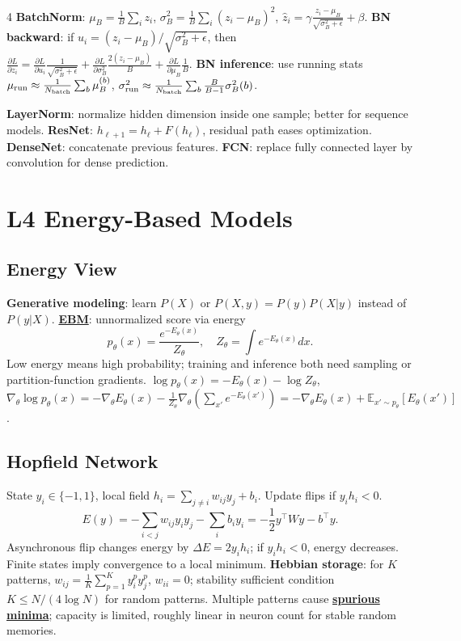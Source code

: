 \documentclass{article}
\newcommand{\key}[1]{\textbf{#1}}
\newcommand{\lowterm}[1]{\textbf{\underline{#1}}}
\newcommand{\E}{\mathbb{E}}
\newcommand{\1}{\mathbf 1}
\begin{document}
\begin{multicols*}{4}
\key{BatchNorm}: $\mu_B=\frac1B\sum_i z_i$, $\sigma_B^2=\frac1B\sum_i(z_i-\mu_B)^2$,
\(
\hat z_i=\gamma\frac{z_i-\mu_B}{\sqrt{\sigma_B^2+\epsilon}}+\beta.
\)
\key{BN backward}: if $u_i=(z_i-\mu_B)/\sqrt{\sigma_B^2+\epsilon}$, then
$\frac{\partial L}{\partial z_i}=\frac{\partial L}{\partial u_i}\frac1{\sqrt{\sigma_B^2+\epsilon}}+\frac{\partial L}{\partial\sigma_B^2}\frac{2(z_i-\mu_B)}{B}+\frac{\partial L}{\partial\mu_B}\frac1B$.
\key{BN inference}: use running stats
$\mu_{\rm run}\approx\frac1{N_{\rm batch}}\sum_b\mu_B^{(b)}$, $\sigma_{\rm run}^2\approx\frac1{N_{\rm batch}}\sum_b\frac{B}{B-1}\sigma_B^2(b)$.

\key{LayerNorm}: normalize hidden dimension inside one sample; better for sequence models. \key{ResNet}: $h_{\ell+1}=h_\ell+F(h_\ell)$, residual path eases optimization. \key{DenseNet}: concatenate previous features. \key{FCN}: replace fully connected layer by convolution for dense prediction.

\section{L4 Energy-Based Models}
\subsection{Energy View}
\key{Generative modeling}: learn $P(X)$ or $P(X,y)=P(y)P(X|y)$ instead of $P(y|X)$. \lowterm{EBM}: unnormalized score via energy
\[
p_\theta(x)=\frac{e^{-E_\theta(x)}}{Z_\theta},\quad Z_\theta=\int e^{-E_\theta(x)}dx.
\]
Low energy means high probability; training and inference both need sampling or partition-function gradients. $\log p_\theta(x)=-E_\theta(x)-\log Z_\theta$, $\nabla_\theta\log p_\theta(x)=-\nabla_\theta E_\theta(x)-\frac{1}{Z_\theta}\nabla_\theta \left(\sum_{x'} e^{-E_\theta(x')}\right)=-\nabla_\theta E_\theta(x)+\E_{x'\sim p_\theta}[E_\theta(x')]$. 

\subsection{Hopfield Network}
State $y_i\in\{-1,1\}$, local field $h_i=\sum_{j\ne i}w_{ij}y_j+b_i$. Update flips if $y_ih_i<0$.
\[
E(y)=-\sum_{i<j}w_{ij}y_iy_j-\sum_i b_iy_i=-\frac12y^\top Wy-b^\top y.
\]
Asynchronous flip changes energy by $\Delta E=2y_ih_i$; if $y_ih_i<0$, energy decreases. Finite states imply convergence to a local minimum. \key{Hebbian storage}: for $K$ patterns, $w_{ij}=\frac1K\sum_{p=1}^K y_i^py_j^p$, $w_{ii}=0$; stability sufficient condition $K\le N/(4\log N)$ for random patterns. Multiple patterns cause \lowterm{spurious minima}; capacity is limited, roughly linear in neuron count for stable random memories.


\end{multicols*}
\end{document}
